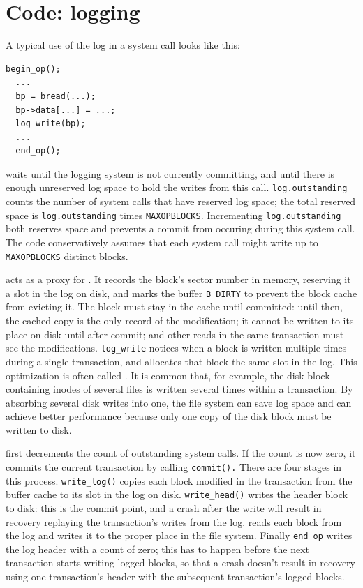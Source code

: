 \section{Code: logging}

A typical use of the log in a system call looks like this:
\begin{lstlisting}[]
  begin_op();
  ...
  bp = bread(...);
  bp->data[...] = ...;
  log_write(bp);
  ...
  end_op();
\end{lstlisting}

waits until
the logging system is not currently committing, and until
there is enough unreserved log space to hold
the writes from this call.
\lstinline{log.outstanding}
counts the number of system calls that have reserved log
space; the total reserved space is 
\lstinline{log.outstanding}
times
\lstinline{MAXOPBLOCKS}.
Incrementing
\lstinline{log.outstanding}
both reserves space and prevents a commit
from occuring during this system call.
The code conservatively assumes that each system call might write up to
\lstinline{MAXOPBLOCKS}
distinct blocks.

acts as a proxy for 
.
It records the block's sector number in memory,
reserving it a slot in the log on disk,
and marks the buffer
\lstinline{B_DIRTY}
to prevent the block cache from evicting it.
The block must stay in the cache until committed:
until then, the cached copy is the only record
of the modification; it cannot be written to
its place on disk until after commit;
and other reads in the same transaction must
see the modifications.
\lstinline{log_write}
notices when a block is written multiple times during a single
transaction, and allocates that block the same slot in the log.
This optimization is often called
.
It is common that, for example, the disk block containing inodes
of several files is written several times within a transaction.  By absorbing
several disk writes into one, the file system can save log space and
can achieve better performance because only one copy of the disk block must be
written to disk.

first decrements the count of outstanding system calls.
If the count is now zero, it commits the current
transaction by calling
\lstinline{commit().}
There are four stages in this process.
\lstinline{write_log()}
copies each block modified in the transaction from the buffer
cache to its slot in the log on disk.
\lstinline{write_head()}
writes the header block to disk: this is the
commit point, and a crash after the write will
result in recovery replaying the transaction's writes from the log.
reads each block from the log and writes it to the proper
place in the file system.
Finally
\lstinline{end_op}
writes the log header with a count of zero;
this has to happen before the next transaction starts writing
logged blocks, so that a crash doesn't result in recovery
using one transaction's header with the subsequent transaction's
logged blocks.

